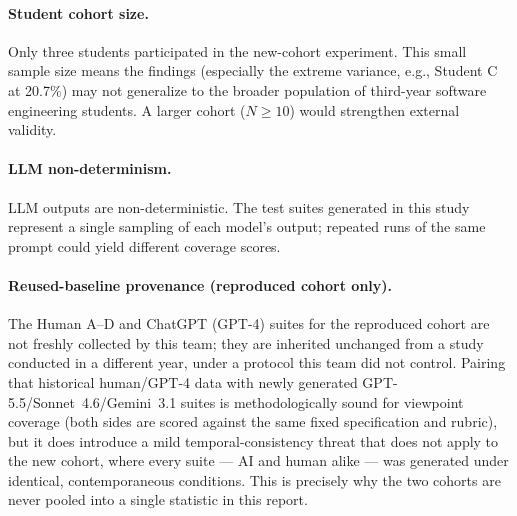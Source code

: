 \documentclass[12pt,a4paper]{article}
\begin{document}
\paragraph{Student cohort size.} Only three students participated in the new-cohort experiment. This small sample size means the findings (especially the extreme variance, e.g., Student C at 20.7\%) may not generalize to the broader population of third-year software engineering students. A larger cohort ($N \geq 10$) would strengthen external validity.

\paragraph{LLM non-determinism.} LLM outputs are non-deterministic. The test suites generated in this study represent a single sampling of each model's output; repeated runs of the same prompt could yield different coverage scores.

\paragraph{Reused-baseline provenance (reproduced cohort only).} The Human A--D and ChatGPT (GPT-4) suites for the reproduced cohort are not freshly collected by this team; they are inherited unchanged from a study conducted in a different year, under a protocol this team did not control. Pairing that historical human/GPT-4 data with newly generated GPT-5.5/Sonnet~4.6/Gemini~3.1 suites is methodologically sound for viewpoint coverage (both sides are scored against the same fixed specification and rubric), but it does introduce a mild temporal-consistency threat that does not apply to the new cohort, where every suite --- AI and human alike --- was generated under identical, contemporaneous conditions. This is precisely why the two cohorts are never pooled into a single statistic in this report.
\end{document}
